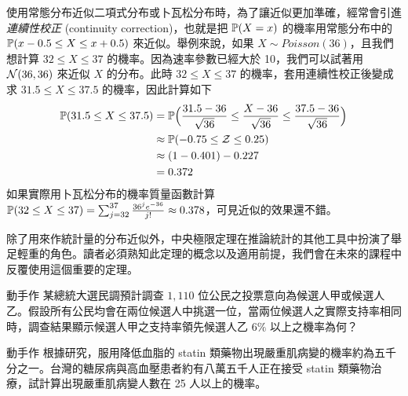     使用常態分布近似二項式分布或卜瓦松分布時，為了讓近似更加準確，經常會引進\textit{連續性校正} (continuity correction)，也就是把 $\mathbb{P}(X = x)$ 的機率用常態分布中的 $\mathbb{P}(x-0.5 \le X \le x + 0.5)$ 來近似。舉例來說，如果 $X \sim Poisson(36)$，且我們想計算 $32 \le X \le 37$ 的機率。因為速率參數已經大於 10，我們可以試著用 $\mathcal{N}(36, 36)$ 來近似 $X$ 的分布。此時 $32 \le X \le 37$ 的機率，套用連續性校正後變成求 $31.5 \le X \le 37.5$ 的機率，因此計算如下
    \smallskip
    \begin{align*}
        \mathbb{P}(31.5 \le X \le 37.5) &= \mathbb{P}\Big(\frac{31.5-36}{\sqrt{36}} \le \frac{X-36}{\sqrt{36}} \le \frac{37.5-36}{\sqrt{36}}\Big)\\
        &\approx \mathbb{P}(-0.75 \le \mathcal{Z} \le 0.25)\\
        &\approx (1-0.401)-0.227\\
        &= 0.372
    \end{align*}
    \smallskip
    如果實際用卜瓦松分布的機率質量函數計算 $\mathbb{P}(32 \le X \le 37) = \sum_{j=32}^{37} \frac{36^j e^{-36}}{j!} \approx 0.378$，可見近似的效果還不錯。
    
    \medskip
    
    除了用來作統計量的分布近似外，中央極限定理在推論統計的其他工具中扮演了舉足輕重的角色。讀者必須熟知此定理的概念以及適用前提，我們會在未來的課程中反覆使用這個重要的定理。

    \bigskip

    \begin{custom}{動手作}
        某總統大選民調預計調查 $1,110$ 位公民之投票意向為候選人甲或候選人乙。假設所有公民均會在兩位候選人中挑選一位，當兩位候選人之實際支持率相同時，調查結果顯示候選人甲之支持率領先候選人乙 $6\%$ 以上之機率為何？
    \end{custom}

    \answerbox{230pt}

    \bigskip
    
    \begin{custom}{動手作}
        根據研究，服用降低血脂的 statin 類藥物出現嚴重肌病變的機率約為五千分之一。台灣的糖尿病與高血壓患者約有八萬五千人正在接受 statin 類藥物治療，試計算出現嚴重肌病變人數在 25 人以上的機率。
    \end{custom}
    
    \answerbox{230pt}

    \bigskip
    
